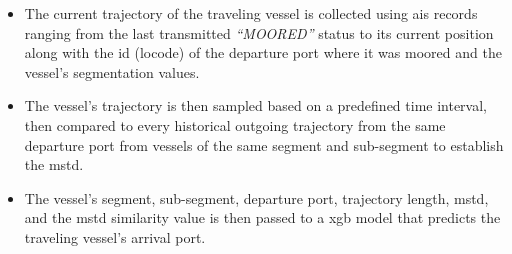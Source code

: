 \begin{itemize}
    \item The current trajectory of the traveling vessel is collected using \acrshort{ais} records ranging from the last transmitted \textit{``MOORED''} status to its current position along with the id (\gls{locode}) of the departure port where it was moored and the vessel's segmentation values.
    \item The vessel's trajectory is then sampled based on a predefined time interval, then compared to every historical outgoing trajectory from the same departure port from vessels of the same segment and sub-segment to establish the \acrfull{mstd}.
    \item The vessel's segment, sub-segment, departure port, trajectory length, \acrshort{mstd}, and the \acrshort{mstd} similarity value is then passed to a \acrshort{xgb} model that predicts the traveling vessel's arrival port.
\end{itemize}
